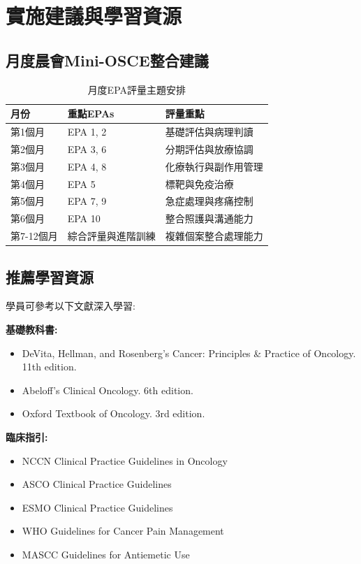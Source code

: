 \documentclass[12pt,a4paper]{article}
\begin{document}
\section{實施建議與學習資源}

\subsection{月度晨會Mini-OSCE整合建議}
\begin{table}[h]
    \centering
    \caption{月度EPA評量主題安排}
    \begin{tabular}{p{2.5cm} p{4.5cm} p{7cm}}
        \toprule
        \textbf{月份} & \textbf{重點EPAs} & \textbf{評量重點} \\
        \midrule
        第1個月 & EPA 1, 2 & 基礎評估與病理判讀 \\
        第2個月 & EPA 3, 6 & 分期評估與放療協調 \\
        第3個月 & EPA 4, 8 & 化療執行與副作用管理 \\
        第4個月 & EPA 5 & 標靶與免疫治療 \\
        第5個月 & EPA 7, 9 & 急症處理與疼痛控制 \\
        第6個月 & EPA 10 & 整合照護與溝通能力 \\
        第7-12個月 & 綜合評量與進階訓練 & 複雜個案整合處理能力 \\
        \bottomrule
    \end{tabular}
\end{table}

\subsection{推薦學習資源}
學員可參考以下文獻深入學習:

\textbf{基礎教科書:}
\begin{itemize}
    \item DeVita, Hellman, and Rosenberg's Cancer: Principles \& Practice of Oncology. 11th edition.
    \item Abeloff's Clinical Oncology. 6th edition.
    \item Oxford Textbook of Oncology. 3rd edition.
\end{itemize}

\textbf{臨床指引:}
\begin{itemize}
    \item NCCN Clinical Practice Guidelines in Oncology
    \item ASCO Clinical Practice Guidelines
    \item ESMO Clinical Practice Guidelines
    \item WHO Guidelines for Cancer Pain Management
    \item MASCC Guidelines for Antiemetic Use
\end{itemize}
\end{document}
